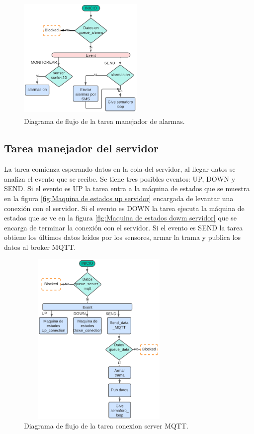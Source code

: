 \begin{figure}[h]
  \centering
	\includegraphics[width=6cm, height=6cm]{./Figures/DF_alarms.png}
	\caption{Diagrama de flujo de la tarea manejador de alarmas.}
	\label{fig:Df tarea alarmas}
\end{figure}

\subsection{Tarea manejador del servidor } 
La tarea comienza esperando datos en la cola del servidor, al llegar datos se analiza el evento que se recibe. Se tiene tres posibles eventos: UP, DOWN y SEND. Si el evento es UP la tarea entra a la máquina de estados que se muestra en la figura \ref{fig:Maquina de estados up servidor} encargada de levantar una conexión con el servidor. Si el evento es DOWN la tarea ejecuta la máquina de estados que se ve en la figura \ref{fig:Maquina de estados dowm servidor} que se encarga de terminar la conexión con el servidor. Si el evento es SEND la tarea obtiene los últimos datos leídos por los sensores, armar la trama y publica los datos al broker MQTT. 
\begin{figure}[h]
  \centering
	\includegraphics[width=8cm, height=8.5cm]{./Figures/DF general task conection.png}
	\caption{Diagrama de flujo de la tarea conexion server MQTT.}
	\label{fig:Df tarea conexion}
\end{figure}

